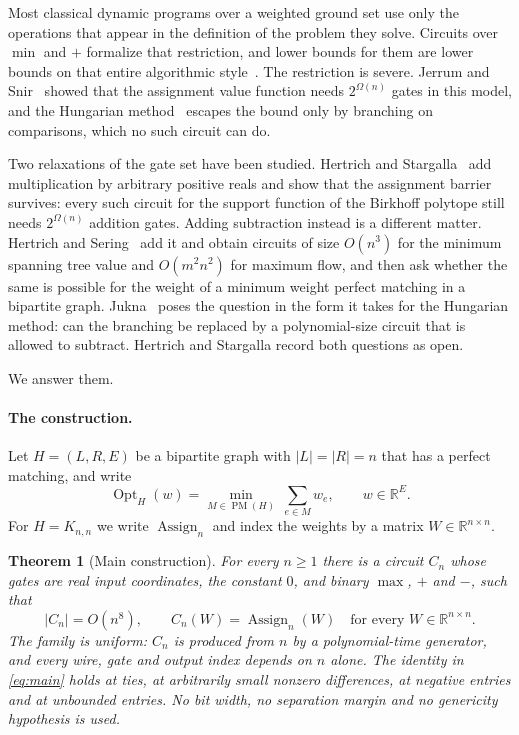 \documentclass[11pt]{article}
\newtheorem{theorem}{Theorem}[section]
\newcommand{\Assign}{\operatorname{Assign}}
\newcommand{\Opt}{\operatorname{Opt}}
\newcommand{\PM}{\operatorname{PM}}
\begin{document}
Most classical dynamic programs over a weighted ground set use only the
operations that appear in the definition of the problem they solve.  Circuits
over $\min$ and $+$ formalize that restriction, and lower bounds for them are
lower bounds on that entire algorithmic style~\cite{jukna23-tropical}.  The
restriction is severe.  Jerrum and Snir~\cite{jerrum-snir82} showed that the
assignment value function needs $2^{\Omega(n)}$ gates in this model, and the
Hungarian method~\cite{kuhn55} escapes the bound only by branching on
comparisons, which no such circuit can do.

Two relaxations of the gate set have been studied.  Hertrich and
Stargalla~\cite{hertrich-stargalla26} add multiplication by arbitrary positive
reals and show that the assignment barrier survives: every such circuit for the
support function of the Birkhoff polytope still needs $2^{\Omega(n)}$ addition
gates.  Adding subtraction instead is a different matter.  Hertrich and
Sering~\cite{hertrich-sering25} add it and obtain circuits of size $O(n^{3})$
for the minimum spanning tree value and $O(m^{2}n^{2})$ for maximum flow, and
then ask whether the same is possible for the weight of a minimum weight perfect
matching in a bipartite graph.  Jukna~\cite[Section 6.5, Problem
3]{jukna23-tropical} poses the question in the form it takes for the Hungarian
method: can the branching be replaced by a polynomial-size circuit that is
allowed to subtract.  Hertrich and Stargalla record both questions as open.

We answer them.

\paragraph{The construction.}
Let $H=(L,R,E)$ be a bipartite graph with $|L|=|R|=n$ that has a perfect
matching, and write
\begin{equation}
  \Opt_H(w)=\min_{M\in\PM(H)}\ \sum_{e\in M}w_e,
  \qquad w\in\mathbb R^{E}.
  \label{eq:opt}
\end{equation}
For $H=K_{n,n}$ we write $\Assign_n$ and index the weights by a matrix
$W\in\mathbb R^{n\times n}$.

\begin{theorem}[Main construction]
\label{thm:main}
For every $n\ge1$ there is a circuit $C_n$ whose gates are real input
coordinates, the constant $0$, and binary $\max$, $+$ and $-$, such that
\begin{equation}
  \boxed{\;
  |C_n|=O(n^{8}),
  \qquad
  C_n(W)=\Assign_n(W)
  \quad\text{for every } W\in\mathbb R^{n\times n}.
  \;}
  \label{eq:main}
\end{equation}
The family is uniform: $C_n$ is produced from $n$ by a polynomial-time
generator, and every wire, gate and output index depends on $n$ alone.  The
identity in \eqref{eq:main} holds at ties, at arbitrarily small nonzero
differences, at negative entries and at unbounded entries.  No bit width, no
separation margin and no genericity hypothesis is used.
\end{theorem}
\end{document}
